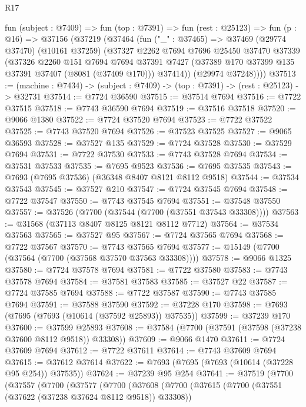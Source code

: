 \begin{lexlean}{R17}
\begin{coremodule}
  fun (subject : @7409) =>
  fun (top : @7391) =>
  fun (rest : @25123) =>
  fun (p : @16) =>
  @37156
    (@37219
      (@37464
        (fun ("_" : @37465) =>
        @37469
          (@29774 @37470)
          (@10161 @37259)
          (@37327
            @2262
            @7694
            @7696
            @25450
            @37470
            @37339
            (@37326
              @2260
              @151
              @7694
              @7694
              @37391
              @7427
              (@37389 @170 @37399 @135 @37391 @37407 (@8081 (@37409 @170)))
              @37414))
          (@29974 @37248))))
@37513 := (machine : @7434) -> (subject : @7409) -> (top : @7391) -> (rest : @25123) -> @32731
@37514 := @7724 @36590
@37515 := @37514 @7694
@37516 := @7722 @37515
@37518 := @7743 @36590 @7694
@37519 := @37516 @37518
@37520 := @9066 @1380
@37522 := @7724 @37520 @7694
@37523 := @7722 @37522
@37525 := @7743 @37520 @7694
@37526 := @37523 @37525
@37527 := @9065 @36593
@37528 := @37527 @135
@37529 := @7724 @37528
@37530 := @37529 @7694
@37531 := @7722 @37530
@37533 := @7743 @37528 @7694
@37534 := @37531 @37533
@37535 := @7695 @9523
@37536 := @7695 @37535
@37543 := @7693 (@7695 @37536) (@36348 @8407 @8121 @8112 @9518)
@37544 := @37534 @37543
@37545 := @37527 @210
@37547 := @7724 @37545 @7694
@37548 := @7722 @37547
@37550 := @7743 @37545 @7694
@37551 := @37548 @37550
@37557 := @37526 (@7700 (@37544 (@7700 (@37551 @37543 @33308))))
@37563 := @31568 (@37113 @8407 @8125 @8121 @8112 @7712)
@37564 := @37534 @37563
@37565 := @37527 @95
@37567 := @7724 @37565 @7694
@37568 := @7722 @37567
@37570 := @7743 @37565 @7694
@37577 := @15149 (@7700 (@37564 (@7700 (@37568 @37570 @37563 @33308))))
@37578 := @9066 @1325
@37580 := @7724 @37578 @7694
@37581 := @7722 @37580
@37583 := @7743 @37578 @7694
@37584 := @37581 @37583
@37585 := @37527 @22
@37587 := @7724 @37585 @7694
@37588 := @7722 @37587
@37590 := @7743 @37585 @7694
@37591 := @37588 @37590
@37592 := @37228 @170
@37598 := @7693 (@7695 (@7693 (@10614 (@37592 @25893)) @37535))
@37599 := @37239 @170
@37600 := @37599 @25893
@37608 := @37584 (@7700 (@37591 (@37598 (@37238 @37600 @8112 @9518)) @33308))
@37609 := @9066 @1470
@37611 := @7724 @37609 @7694
@37612 := @7722 @37611
@37614 := @7743 @37609 @7694
@37615 := @37612 @37614
@37622 := @7693 (@7695 (@7693 (@10614 (@37228 @95 @254)) @37535))
@37624 := @37239 @95 @254
@37641 := @37519
    (@7700
      (@37557
        (@7700
          (@37577
            (@7700
              (@37608
                (@7700
                  (@37615
                    (@7700 (@37551 (@37622 (@37238 @37624 @8112 @9518)) @33308))

\end{coremodule}
\end{lexlean}
